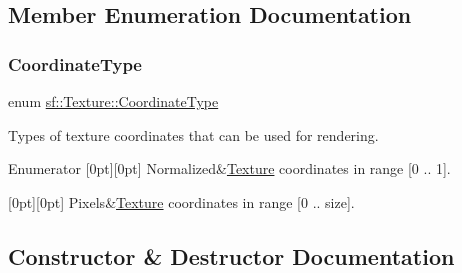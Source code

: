 \subsection{Member Enumeration Documentation}
\mbox{\label{classsf_1_1_texture_aa6fd3bbe3c334b3c4428edfb2765a82e}} 
\subsubsection{\texorpdfstring{CoordinateType}{CoordinateType}}
{\footnotesize\ttfamily enum \mbox{\hyperlink{classsf_1_1_texture_aa6fd3bbe3c334b3c4428edfb2765a82e}{sf\+::\+Texture\+::\+Coordinate\+Type}}}



Types of texture coordinates that can be used for rendering. 

\begin{DoxyVerb}\end{DoxyVerb}
 \begin{DoxyEnumFields}{Enumerator}
[0pt][0pt]{}\mbox{\label{classsf_1_1_texture_aa6fd3bbe3c334b3c4428edfb2765a82ea69d6228950882e4d68be4ba4dbe7df73}} 
Normalized&\mbox{\hyperlink{classsf_1_1_texture}{Texture}} coordinates in range \mbox{[}0 .. 1\mbox{]}. \\
\hline

[0pt][0pt]{}\mbox{\label{classsf_1_1_texture_aa6fd3bbe3c334b3c4428edfb2765a82ea6372f9c3a10203a7a69d8d5da59d82ff}} 
Pixels&\mbox{\hyperlink{classsf_1_1_texture}{Texture}} coordinates in range \mbox{[}0 .. size\mbox{]}. \\
\hline

\end{DoxyEnumFields}


\subsection{Constructor \& Destructor Documentation}
\mbox{\label{classsf_1_1_texture_a3e04674853b8533bf981db3173e3a4a7}} 
